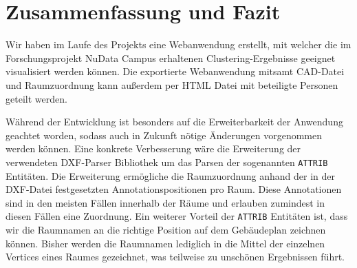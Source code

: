 \section{Zusammenfassung und Fazit}
\label{sec:summary}

Wir haben im Laufe des Projekts eine Webanwendung erstellt, mit welcher die im Forschungsprojekt \glqq{}NuData Campus\grqq{} erhaltenen Clustering-Ergebnisse geeignet visualisiert werden können.
Die exportierte Webanwendung mitsamt CAD-Datei und Raumzuordnung kann außerdem per HTML Datei mit beteiligte Personen geteilt werden.

Während der Entwicklung ist besonders auf die Erweiterbarkeit der Anwendung geachtet worden, sodass auch in Zukunft nötige Änderungen vorgenommen werden können.
Eine konkrete Verbesserung wäre die Erweiterung der verwendeten DXF-Parser Bibliothek um das Parsen der sogenannten \texttt{ATTRIB} Entitäten.
Die Erweiterung ermögliche die Raumzuordnung anhand der in der DXF-Datei festgesetzten Annotationspositionen pro Raum.
Diese Annotationen sind in den meisten Fällen innerhalb der Räume und erlauben zumindest in diesen Fällen eine Zuordnung.
Ein weiterer Vorteil der \texttt{ATTRIB} Entitäten ist, dass wir die Raumnamen an die richtige Position auf dem Gebäudeplan zeichnen können.
Bisher werden die Raumnamen lediglich in die Mittel der einzelnen Vertices eines Raumes gezeichnet, was teilweise zu unschönen Ergebnissen führt.
